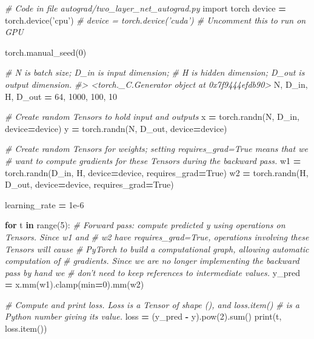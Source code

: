 \documentclass[]{book}
\newenvironment{Shaded}{\begin{snugshade}}{\end{snugshade}}
\newcommand{\BuiltInTok}[1]{#1}
\newcommand{\CommentTok}[1]{\textcolor[rgb]{0.56,0.35,0.01}{\textit{#1}}}
\newcommand{\ControlFlowTok}[1]{\textcolor[rgb]{0.13,0.29,0.53}{\textbf{#1}}}
\newcommand{\DecValTok}[1]{\textcolor[rgb]{0.00,0.00,0.81}{#1}}
\newcommand{\FloatTok}[1]{\textcolor[rgb]{0.00,0.00,0.81}{#1}}
\newcommand{\ImportTok}[1]{#1}
\newcommand{\KeywordTok}[1]{\textcolor[rgb]{0.13,0.29,0.53}{\textbf{#1}}}
\newcommand{\NormalTok}[1]{#1}
\newcommand{\OperatorTok}[1]{\textcolor[rgb]{0.81,0.36,0.00}{\textbf{#1}}}
\newcommand{\StringTok}[1]{\textcolor[rgb]{0.31,0.60,0.02}{#1}}
\newcommand{\VariableTok}[1]{\textcolor[rgb]{0.00,0.00,0.00}{#1}}
\begin{document}
\begin{Shaded}
\begin{Highlighting}[]
\CommentTok{# Code in file autograd/two_layer_net_autograd.py}
\ImportTok{import}\NormalTok{ torch}
\NormalTok{device }\OperatorTok{=}\NormalTok{ torch.device(}\StringTok{'cpu'}\NormalTok{)}
\CommentTok{# device = torch.device('cuda') # Uncomment this to run on GPU}

\NormalTok{torch.manual_seed(}\DecValTok{0}\NormalTok{)}

\CommentTok{# N is batch size; D_in is input dimension;}
\CommentTok{# H is hidden dimension; D_out is output dimension.}
\CommentTok{#> <torch._C.Generator object at 0x7f9444efdb90>}
\NormalTok{N, D_in, H, D_out }\OperatorTok{=} \DecValTok{64}\NormalTok{, }\DecValTok{1000}\NormalTok{, }\DecValTok{100}\NormalTok{, }\DecValTok{10}

\CommentTok{# Create random Tensors to hold input and outputs}
\NormalTok{x }\OperatorTok{=}\NormalTok{ torch.randn(N, D_in, device}\OperatorTok{=}\NormalTok{device)}
\NormalTok{y }\OperatorTok{=}\NormalTok{ torch.randn(N, D_out, device}\OperatorTok{=}\NormalTok{device)}

\CommentTok{# Create random Tensors for weights; setting requires_grad=True means that we}
\CommentTok{# want to compute gradients for these Tensors during the backward pass.}
\NormalTok{w1 }\OperatorTok{=}\NormalTok{ torch.randn(D_in, H, device}\OperatorTok{=}\NormalTok{device, requires_grad}\OperatorTok{=}\VariableTok{True}\NormalTok{)}
\NormalTok{w2 }\OperatorTok{=}\NormalTok{ torch.randn(H, D_out, device}\OperatorTok{=}\NormalTok{device, requires_grad}\OperatorTok{=}\VariableTok{True}\NormalTok{)}

\NormalTok{learning_rate }\OperatorTok{=} \FloatTok{1e-6}

\ControlFlowTok{for}\NormalTok{ t }\KeywordTok{in} \BuiltInTok{range}\NormalTok{(}\DecValTok{5}\NormalTok{):}
  \CommentTok{# Forward pass: compute predicted y using operations on Tensors. Since w1 and}
  \CommentTok{# w2 have requires_grad=True, operations involving these Tensors will cause}
  \CommentTok{# PyTorch to build a computational graph, allowing automatic computation of}
  \CommentTok{# gradients. Since we are no longer implementing the backward pass by hand we}
  \CommentTok{# don't need to keep references to intermediate values.}
\NormalTok{  y_pred }\OperatorTok{=}\NormalTok{ x.mm(w1).clamp(}\BuiltInTok{min}\OperatorTok{=}\DecValTok{0}\NormalTok{).mm(w2)}
  
  \CommentTok{# Compute and print loss. Loss is a Tensor of shape (), and loss.item()}
  \CommentTok{# is a Python number giving its value.}
\NormalTok{  loss }\OperatorTok{=}\NormalTok{ (y_pred }\OperatorTok{-}\NormalTok{ y).}\BuiltInTok{pow}\NormalTok{(}\DecValTok{2}\NormalTok{).}\BuiltInTok{sum}\NormalTok{()}
  \BuiltInTok{print}\NormalTok{(t, loss.item())}


\end{Highlighting}
\end{Shaded}
\end{document}
